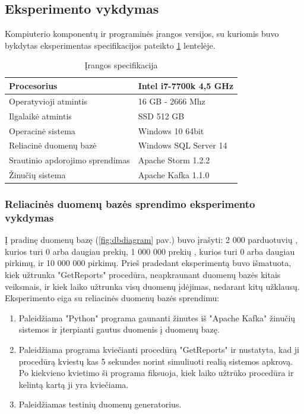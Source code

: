 \documentclass{VUMIFPSkursinis}
\begin{document}
\subsection{Eksperimento vykdymas}
Kompiuterio komponentų ir programinės įrangos versijos, su kuriomis buvo bykdytas eksperimentas specifikacijos pateikto \ref{table:hardware} lentelėje.
\begin{table}[!htbp]
    \begin{center}
        \caption{Įrangos specifikacija}
        \label{table:hardware}
        \begin{tabular}{ | l | l |  } 
            \hline
            Procesorius & Intel i7-7700k 4,5 GHz \\* \hline
            Operatyvioji atmintis & 16 GB - 2666 Mhz \\* \hline
            Ilgalaikė atmintis & SSD 512 GB \\* \hline
            Operacinė sistema & Windows 10 64bit \\* \hline
            Reliacinė duomenų bazė & Windows SQL Server 14 \\* \hline
            Srautinio apdorojimo sprendimas & Apache Storm 1.2.2 \\* \hline
            Žinučių sistema & Apache Kafka 1.1.0 \\* \hline
        \end{tabular}
    \end{center}
\end{table}\par

\subsubsection{Reliacinės duomenų bazės sprendimo eksperimento vykdymas}
Į pradinę duomenų bazę (\ref{fig:dbdiagram} pav.) buvo įrašyti: 2 000 parduotuvių , kurios turi 0 arba daugiau prekių, 1 000 000 prekių , kurios turi 0 arba daugiau pirkimų, ir 10 000 000 pirkimų.
Prieš pradedant eksperimentą buvo išmatuota, kiek užtrunka "GetReports" procedūra, neapkraunant duomenų bazės kitais veiksmais, ir kiek laiko užtrunka visų duomenų įdėjimas,
nedarant kitų užklausų. 
Eksperimento eiga su reliacinės duomenų bazės sprendimu:
\begin{enumerate} 
\item Paleidžiama "Python" programa gaunanti žinutes iš "Apache Kafka" žinučių sistemos ir įterpianti gautus duomenis į duomenų bazę. 
\item Paleidžiama programa kviečianti procedūrą "GetReports" ir nustatyta, kad ji procedūrą kviestų kas 5 sekundes norint simuliuoti realią sistemos apkrovą.
Po kiekvieno kvietimo ši programa fiksuoja, kiek laiko užtrūko procedūra ir kelintą kartą ji yra kviečiama. 
\item Paleidžiamas testinių duomenų generatorius.
\end{enumerate}
\end{document}
